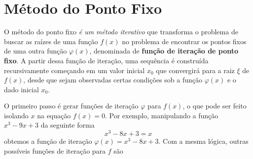 
\section{Método do Ponto Fixo}

O método do ponto fixo \emph{é um método iterativo} que %
transforma o problema de buscar as raízes de uma função $f(x)$ no problema de encontrar os pontos fixos de uma outra função $\varphi(x)$, denominada de \textbf{função de iteração de ponto fixo}. 
A partir dessa função de iteração, uma sequência é construída recursivamente começando em um valor inicial $x_0$ que convergirá para a raiz $\xi$ de $f(x)$, desde que sejam observadas certas condições sob a função $\varphi(x)$ e o dado inicial $x_0$.

O primeiro passo é gerar funções de iteração $\varphi$ para $f(x)$, o que pode ser feito isolando $x$ na equação $f(x) = 0$. Por exemplo, manipulando a função $x^3 -9x + 3$  da seguinte forma 
\begin{equation*}
    x^3 - 8x + 3 = x 
\end{equation*} 
obtemos a função de iteração $\varphi(x) = x^3 - 8x + 3$. Com a mesma lógica, outras possíveis funções de iteração para $f$ são

